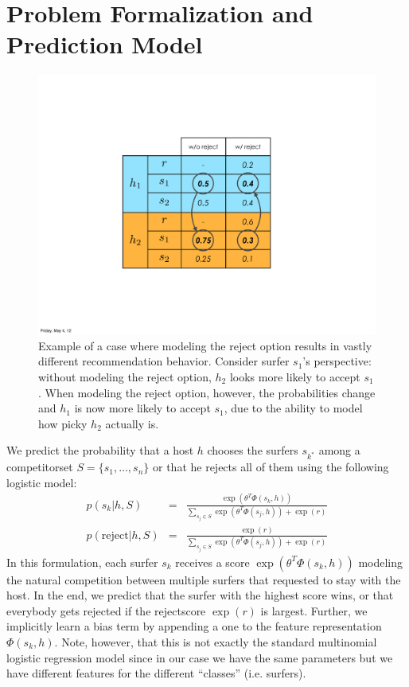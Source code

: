 \section{Problem Formalization and Prediction Model} \label{sec:model}

\begin{figure}[ht]
\centering
\includegraphics[width=0.6\linewidth]{figures/reject_vs_no_reject.pdf}
\caption{
Example of a case where modeling the reject option results in vastly different recommendation behavior.
Consider surfer $s_1$'s perspective: without modeling the reject option, $h_2$ looks more likely to accept $s_1$.
When modeling the reject option, however, the probabilities change and $h_1$ is now more likely to accept $s_1$, due to the ability to model how picky $h_2$ actually is.}
\label{fig:reject_vs_no_reject}
\end{figure}

We predict the probability that a host $h$ chooses the surfers $s_{k^*}$ among a competitorset $S=\{ s_1, \dots, s_n\}$ or that he rejects all of them using the following logistic model:
\begin{eqnarray}
p(s_k | h, S) &=& \frac{\exp(\theta^T \Phi(s_k,h))}{\sum_{s_j \in S} \exp(\theta^T \Phi(s_j,h)) + \exp(r)} \\
p(\text{reject} | h, S) &=& \frac{\exp(r)}{\sum_{s_j \in S} \exp(\theta^T \Phi(s_j,h)) + \exp(r)}
\end{eqnarray}
In this formulation, each surfer $s_k$ receives a score $\exp(\theta^T \Phi(s_k,h))$ modeling the natural competition between multiple surfers that requested to stay with the host. In the end, we predict that the surfer with the highest score wins, or that everybody gets rejected if the rejectscore $\exp{(r)}$ is largest. 
Further, we implicitly learn a bias term by appending a one to the feature representation $\Phi(s_k,h)$.
Note, however, that this is not exactly the standard multinomial logistic regression model since in our case we have the same parameters but we have different features for the different ``classes'' (i.e. surfers).

